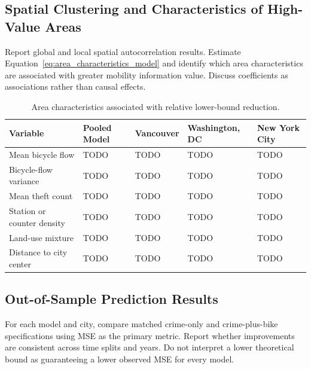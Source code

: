 \documentclass[applsci,article,submit,moreauthors]{Definitions/mdpi}
\begin{document}
\subsection{Spatial Clustering and Characteristics of High-Value Areas}
\label{subsec:results_spatial_explanation}

Report global and local spatial autocorrelation results. Estimate Equation~\eqref{eq:area_characteristics_model} and identify which area characteristics are associated with greater mobility information value. Discuss coefficients as associations rather than causal effects.

\begin{table}[H]
\caption{Area characteristics associated with relative lower-bound reduction.}
\label{tab:area_characteristics}
\begin{tabularx}{\textwidth}{lXXXX}
\toprule
\textbf{Variable} & \textbf{Pooled Model} & \textbf{Vancouver} & \textbf{Washington, DC} & \textbf{New York City}\\
\midrule
Mean bicycle flow & TODO & TODO & TODO & TODO\\
Bicycle-flow variance & TODO & TODO & TODO & TODO\\
Mean theft count & TODO & TODO & TODO & TODO\\
Station or counter density & TODO & TODO & TODO & TODO\\
Land-use mixture & TODO & TODO & TODO & TODO\\
Distance to city center & TODO & TODO & TODO & TODO\\
\bottomrule
\end{tabularx}
\end{table}

\subsection{Out-of-Sample Prediction Results}
\label{subsec:results_prediction}

For each model and city, compare matched crime-only and crime-plus-bike specifications using MSE as the primary metric. Report whether improvements are consistent across time splits and years. Do not interpret a lower theoretical bound as guaranteeing a lower observed MSE for every model.
\end{document}
